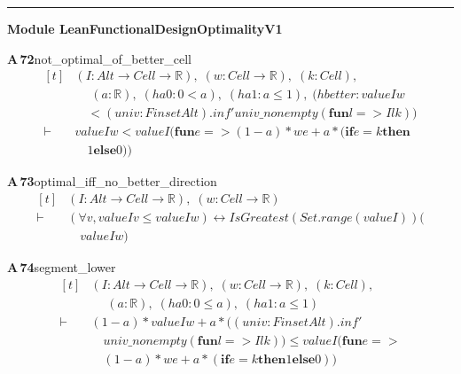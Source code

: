 \documentclass[conference]{IEEEtran}
\theoremstyle{definition}
\newcommand{\lean}[1]{\textsf{\footnotesize #1}}
\begin{document}
\vspace{4pt}\noindent\rule{\columnwidth}{0.4pt}\par\vspace{2pt}
\noindent\textbf{Module \lean{LeanFunctionalDesignOptimalityV1}}\par\vspace{3pt}

\noindent\textbf{A\,72}\quad\lean{not\_optimal\_of\_better\_cell}
{\footnotesize\[ \begin{aligned}[t]
&(\mathit{I} : \mathit{Alt} \to \mathit{Cell} \to \mathbb{R} ),\; (\mathit{w} : \mathit{Cell} \to \mathbb{R} ),\; (\mathit{k} : \mathit{Cell}),\\
&\quad \; (\mathit{a} : \mathbb{R} ),\; (\mathit{ha0} : 0 < \mathit{a}),\; (\mathit{ha1} : \mathit{a} \leq 1),\; (\mathit{hbetter} : \mathit{value} \mathit{I} \mathit{w}\\
&\quad < (\mathit{univ} : \mathit{Finset} \mathit{Alt}).\mathit{inf'} \mathit{univ\_nonempty} (\mathbf{fun} \mathit{l} => \mathit{I} \mathit{l} \mathit{k}))\\
\vdash\;&\mathit{value} \mathit{I} \mathit{w} < \mathit{value} \mathit{I} (\mathbf{fun} \mathit{e} => (1 - \mathit{a}) * \mathit{w} \mathit{e} + \mathit{a} * (\mathbf{if} \mathit{e} = \mathit{k} \mathbf{then}\\
&\quad 1 \mathbf{else} 0))
\end{aligned} \]}

\noindent\textbf{A\,73}\quad\lean{optimal\_iff\_no\_better\_direction}
{\footnotesize\[ \begin{aligned}[t]
&(\mathit{I} : \mathit{Alt} \to \mathit{Cell} \to \mathbb{R} ),\; (\mathit{w} : \mathit{Cell} \to \mathbb{R} )\\
\vdash\;&(\forall \mathit{v}, \mathit{value} \mathit{I} \mathit{v} \leq \mathit{value} \mathit{I} \mathit{w}) \leftrightarrow \mathit{IsGreatest} (\mathit{Set}.\mathit{range} (\mathit{value} \mathit{I})) (\\
&\quad \mathit{value} \mathit{I} \mathit{w})
\end{aligned} \]}

\noindent\textbf{A\,74}\quad\lean{segment\_lower}
{\footnotesize\[ \begin{aligned}[t]
&(\mathit{I} : \mathit{Alt} \to \mathit{Cell} \to \mathbb{R} ),\; (\mathit{w} : \mathit{Cell} \to \mathbb{R} ),\; (\mathit{k} : \mathit{Cell}),\\
&\quad \; (\mathit{a} : \mathbb{R} ),\; (\mathit{ha0} : 0 \leq \mathit{a}),\; (\mathit{ha1} : \mathit{a} \leq 1)\\
\vdash\;&(1 - \mathit{a}) * \mathit{value} \mathit{I} \mathit{w} + \mathit{a} * ((\mathit{univ} : \mathit{Finset} \mathit{Alt}).\mathit{inf'}\\
&\quad \mathit{univ\_nonempty} (\mathbf{fun} \mathit{l} => \mathit{I} \mathit{l} \mathit{k})) \leq \mathit{value} \mathit{I} (\mathbf{fun} \mathit{e} =>\\
&\quad (1 - \mathit{a}) * \mathit{w} \mathit{e} + \mathit{a} * (\mathbf{if} \mathit{e} = \mathit{k} \mathbf{then} 1 \mathbf{else} 0))
\end{aligned} \]}
\end{document}
